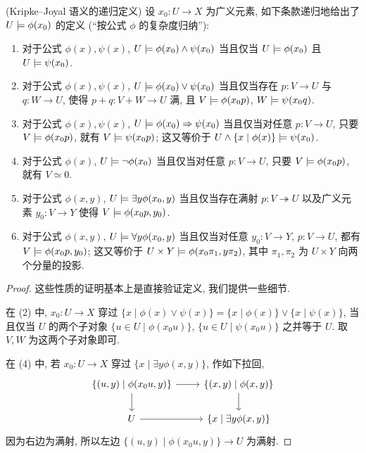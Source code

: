 \begin{propdef}
	{(Kripke--Joyal 语义的递归定义)}
	设 $x_0 \colon U\to X$ 为广义元素, 如下条款递归地给出了 $U\models\phi(x_0)$ 的定义 (``按公式 $\phi$ 的复杂度归纳''):
	\begin{enumerate}[(1)]
		\item 对于公式 $\phi(x), \psi(x)$, $U\models \phi(x_0) \land \psi(x_0)$ 当且仅当 $U\models \phi(x_0)$ 且 $U\models\psi(x_0)$.
		\item 对于公式 $\phi(x), \psi(x)$, $U\models \phi(x_0) \lor \psi(x_0)$ 当且仅当存在 $p\colon V\to U$ 与 $q\colon W\to U$,
		使得 $p+q\colon V+W\to U$ 满, 且 $V\models \phi(x_0 p)$, $W\models\psi(x_0 q)$.
		\item 对于公式 $\phi(x), \psi(x)$, $U\models \phi(x_0) \Rightarrow \psi(x_0)$ 当且仅当对任意 $p\colon V\to U$, 只要 $V\models \phi(x_0 p)$, 就有 $V\models \psi(x_0p)$; 这又等价于 $U\land\{x\mid \phi(x)\}\models \psi(x_0)$.
		\item 对于公式 $\phi(x)$, $U\models \neg\phi(x_0)$ 当且仅当对任意 $p\colon V\to U$, 只要 $V\models\phi(x_0p)$, 就有 $V\simeq 0$.
		\item 对于公式 $\phi(x,y)$, $U \models \exists y \phi(x_0,y)$ 当且仅当存在满射 $p\colon V\twoheadrightarrow U$ 以及广义元素 $y_0\colon V\to Y$ 使得 $V\models \phi(x_0p,y_0)$.
		\item 对于公式 $\phi(x,y)$, $U \models \forall y \phi(x_0,y)$ 当且仅当对任意 $y_0\colon V\to Y$, $p\colon V\to U$, 都有 $V\models \phi(x_0p,y_0)$; 这又等价于 $U\times Y \models \phi(x_0\pi_1,y\pi_2)$, 其中 $\pi_1,\pi_2$ 为 $U\times Y$ 向两个分量的投影.
	\end{enumerate}
\end{propdef}
\begin{proof}
	这些性质的证明基本上是直接验证定义, 我们提供一些细节.
	
	在 (2) 中, $x_0\colon U\to X$ 穿过 $\{x\mid\phi(x)\lor\psi(x)\} = \{x\mid\phi(x)\}\lor\{x\mid\psi(x)\}$,
	当且仅当 $U$ 的两个子对象 $\{u\in U\mid \phi(x_0u)\}$, $\{u\in U\mid \psi(x_0u)\}$ 之并等于 $U$.
	取 $V,W$ 为这两个子对象即可.
	
	在 (4) 中, 若 $x_0\colon U\to X$ 穿过 $\{x\mid \exists y \phi(x,y)\}$, 作如下拉回,
	\[\begin{tikzcd}[ampersand replacement=\&]
		{\{(u,y)\mid\phi(x_0u,y)\}} \& {\{(x,y)\mid\phi(x,y)\}} \\
		U \& {\{x\mid\exists y\phi(x,y)\}}
		\arrow[from=1-1, to=2-1]
		\arrow[from=1-1, to=1-2]
		\arrow[from=2-1, to=2-2]
		\arrow[from=1-2, to=2-2]
	\end{tikzcd}\]
	因为右边为满射, 所以左边 $\{(u,y)\mid \phi(x_0u,y)\}\to U$ 为满射.
\end{proof}

